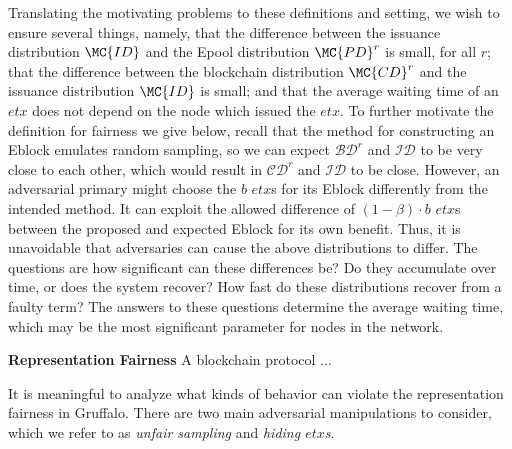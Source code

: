 Translating the motivating problems to these definitions and setting, we wish to ensure several things, namely, that the difference between the issuance distribution $\MC{ID}$ and the Epool distribution $\MC{PD}^r$ is small, for all $r$; that the difference between the blockchain distribution $\MC{CD}^r$ and the issuance distribution $\MC{ID}$ is small; and that the average waiting time of an $etx$ does not depend on the node which issued the $etx$. 
To further motivate the definition for fairness we give below, recall that the method for constructing an Eblock emulates random sampling, so we can expect $\mathcal{BD}^r$ and $\mathcal{ID}$ to be very close to each other, which would result in $\mathcal{CD}^r$ and $\mathcal{ID}$ to be close. However, an adversarial primary might choose the $b$ $etx$s for its Eblock differently from the intended method. It can exploit the allowed difference of $(1-\beta)\cdot b$ $etx$s between the proposed and expected Eblock for its own benefit. Thus, it is unavoidable that adversaries can cause the above distributions to differ. The questions are how significant can these differences be? Do they accumulate over time, or does the system recover? How fast do these distributions recover from a faulty term? The answers to these questions determine the average waiting time, which may be the most significant parameter for nodes in the network.


\begin{definition}{\textbf{Representation Fairness}}
A blockchain protocol ...
\end{definition}

It is meaningful to analyze what kinds of behavior can violate the representation fairness in Gruffalo. There are two main adversarial manipulations to consider, which we refer to as \emph{unfair sampling} and \emph{hiding $etx$s}.

